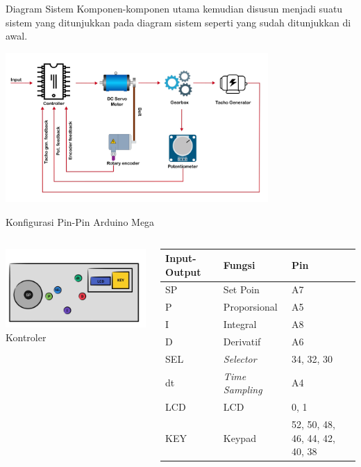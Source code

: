 \documentclass[10pt,xcolor={dvipsnames}]{beamer}
\begin{document}
\begin{frame}{Diagram Sistem}
	Komponen-komponen utama kemudian disusun menjadi suatu sistem yang ditunjukkan pada diagram sistem seperti yang sudah ditunjukkan di awal.
	\begin{center}
		\includegraphics[width=10cm]{Gambar Lain/diagramDCservo.png}
	\end{center}
\end{frame}

\begin{frame}{Konfigurasi Pin-Pin Arduino Mega}
	\begin{columns}[T]
		\begin{column}{0.48\textwidth}
			\centering
			\includegraphics[width=6cm]{Gambar Lain/KONTORU.jpg}
			Kontroler
		\end{column}
		\begin{column}{0.48\textwidth}
			\begin{tabular}{ | m{1cm} | m{2cm}| m{2cm}|} 
				\hline
				\textbf{Input-Output} & \textbf{Fungsi} & \textbf{Pin} \\ 
				\hline
				SP & Set Poin & A7\\ 
				\hline
				P & Proporsional & A5 \\
				\hline
				I & Integral & A8 \\
				\hline
				D & Derivatif & A6 \\
				\hline
				SEL & \textit{Selector} & 34, 32, 30 \\
				\hline
				dt & \textit{Time Sampling} & A4 \\
				\hline
				LCD & LCD & 0, 1 \\
				\hline
				KEY & Keypad & 52, 50, 48, 46, 44, 42, 40, 38 \\
				\hline
			\end{tabular}
		\end{column}
	\end{columns}
\end{frame}
\end{document}
